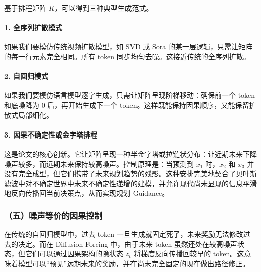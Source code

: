 基于排程矩阵 \(K\)，可以得到三种典型生成范式。

\hypertarget{ux5168ux5e8fux5217ux6269ux6563ux6a21ux5f0f}{%
\paragraph{1. 全序列扩散模式}\label{ux5168ux5e8fux5217ux6269ux6563ux6a21ux5f0f}}

如果我们要模仿传统视频扩散模型，如 SVD 或 Sora 的某一层逻辑，只需让矩阵的每一行元素完全相同。所有 token 同步均匀去噪。这接近传统的全序列扩散。

\hypertarget{ux81eaux56deux5f52ux6a21ux5f0f}{%
\paragraph{2. 自回归模式}\label{ux81eaux56deux5f52ux6a21ux5f0f}}

如果我们要模仿语言模型逐字生成，只需让矩阵呈现阶梯移动：确保前一个 token 和底噪降为 0 后，再开始生成下一个 token。这样既能保持因果顺序，又能保留扩散式局部细化。

\hypertarget{ux56e0ux679cux4e0dux786eux5b9aux6027ux6216ux91d1ux5b57ux5854ux6392ux7a0b}{%
\paragraph{3. 因果不确定性或金字塔排程}\label{ux56e0ux679cux4e0dux786eux5b9aux6027ux6216ux91d1ux5b57ux5854ux6392ux7a0b}}

这是论文的核心创新。它让矩阵呈现一种半金字塔或拉链状分布：让近期未来下降噪声较多，而远期未来保持较高噪声。控制原理是：当预测到 \(x_1\) 时，\(x_2\) 和 \(x_3\) 并没有完全成型，但它们携带了未来规划趋势的残影。这种安排完美地契合了贝叶斯滤波中对不确定世界中未来不确定性递增的建模，并允许现代尚未显现的信息平滑地反向传播回当前决策点，从而实现规划 Guidance。

\hypertarget{ux4e94ux566aux58f0ux7b49ux4ef7ux7684ux56e0ux679cux63a7ux5236}{%
\subsubsection{（五）噪声等价的因果控制}\label{ux4e94ux566aux58f0ux7b49ux4ef7ux7684ux56e0ux679cux63a7ux5236}}

在传统的自回归模型中，过去 token 一旦生成就固定死了，未来奖励无法修改过去的决定。而在 Diffusion Forcing 中，由于未来 token 虽然还处在较高噪声状态，但它们可以通过因果架构的隐状态 \(z_t\) 将梯度反向传播回较早的 token。这意味着模型可以``预见''远期未来的奖励，并在尚未完全固定的现在做出路径修正。

